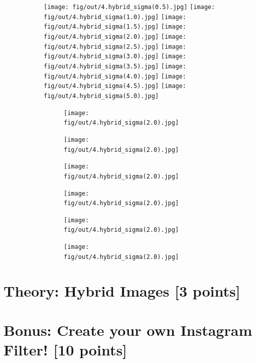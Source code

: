 \documentclass[tikz,14pt,fleqn]{article}
\begin{document}
\begin{figure}[h!]
    \centering
    \begin{subfigure}[]{\linewidth}
        \texttt{[image: fig/out/4.hybrid\_sigma(0.5).jpg]}
        \texttt{[image: fig/out/4.hybrid\_sigma(1.0).jpg]}
        \texttt{[image: fig/out/4.hybrid\_sigma(1.5).jpg]}
        \texttt{[image: fig/out/4.hybrid\_sigma(2.0).jpg]}
        \texttt{[image: fig/out/4.hybrid\_sigma(2.5).jpg]}
        \texttt{[image: fig/out/4.hybrid\_sigma(3.0).jpg]}
        \texttt{[image: fig/out/4.hybrid\_sigma(3.5).jpg]}
        \texttt{[image: fig/out/4.hybrid\_sigma(4.0).jpg]}
        \texttt{[image: fig/out/4.hybrid\_sigma(4.5).jpg]}
        \texttt{[image: fig/out/4.hybrid\_sigma(5.0).jpg]}
    \end{subfigure}
\end{figure}

\begin{figure}[h!]
    \centering
    \begin{subfigure}[]{.8\linewidth}
        \begin{subfigure}[]{.25\linewidth}
            \texttt{[image: fig/out/4.hybrid\_sigma(2.0).jpg]}
        \end{subfigure}
        \begin{subfigure}[]{.2\linewidth}
            \texttt{[image: fig/out/4.hybrid\_sigma(2.0).jpg]}
        \end{subfigure}
        \begin{subfigure}[]{.16\linewidth}
            \texttt{[image: fig/out/4.hybrid\_sigma(2.0).jpg]}
        \end{subfigure}
        \begin{subfigure}[]{.128\linewidth}
            \texttt{[image: fig/out/4.hybrid\_sigma(2.0).jpg]}
        \end{subfigure}
        \begin{subfigure}[]{.1024\linewidth}
            \texttt{[image: fig/out/4.hybrid\_sigma(2.0).jpg]}
        \end{subfigure}
        \begin{subfigure}[]{.08192\linewidth}
            \texttt{[image: fig/out/4.hybrid\_sigma(2.0).jpg]}
        \end{subfigure}

    \end{subfigure}
\end{figure}
\section{Theory: Hybrid Images [3 points]}


\section{Bonus: Create your own Instagram Filter! [10 points]}
\end{document}
